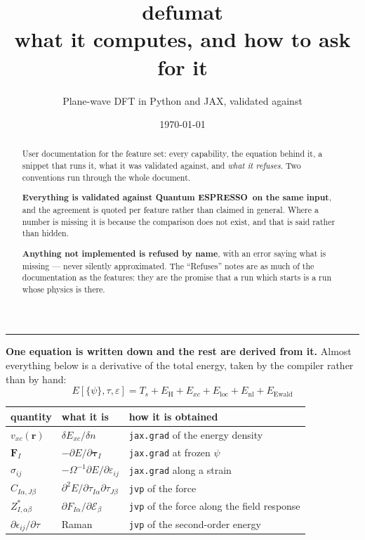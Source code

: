 \documentclass[11pt,a4paper]{article}
\title{\textbf{defumat}\\[4pt]
  \large what it computes, and how to ask for it}
\author{\normalsize Plane-wave DFT in Python and JAX, validated against \qe}
\date{\normalsize\today}
\newcommand{\qe}{Quantum ESPRESSO}
\newcommand{\code}[1]{\texttt{\small #1}}
\begin{document}
\maketitle
\thispagestyle{empty}

\begin{abstract}
\noindent
User documentation for the feature set: every capability, the equation behind
it, a snippet that runs it, what it was validated against, and \emph{what it
refuses}. Two conventions run through the whole document.

\textbf{Everything is validated against \qe\ on the same input}, and the
agreement is quoted per feature rather than claimed in general. Where a number
is missing it is because the comparison does not exist, and that is said rather
than hidden.

\textbf{Anything not implemented is refused by name}, with an error saying what
is missing --- never silently approximated. The ``Refuses'' notes are as much of
the documentation as the features: they are the promise that a run which starts
is a run whose physics is there.
\end{abstract}

\vspace{4pt}
\hrule
\vspace{6pt}

\textbf{One equation is written down and the rest are derived from it.} Almost
everything below is a derivative of the total energy, taken by the compiler
rather than by hand:
\begin{equation*}
E[\{\psi\},\tau,\varepsilon] = T_s + E_{\mathrm H} + E_{xc}
  + E_{\mathrm{loc}} + E_{\mathrm{nl}} + E_{\mathrm{Ewald}}
\end{equation*}

\begin{center}
\small
\begin{tabular}{@{}lll@{}}
\toprule
\textbf{quantity} & \textbf{what it is} & \textbf{how it is obtained} \\
\midrule
$v_{xc}(\mathbf r)$ & $\delta E_{xc}/\delta n$ & \code{jax.grad} of the energy density \\
$\mathbf F_I$ & $-\partial E/\partial\boldsymbol\tau_I$ & \code{jax.grad} at frozen $\psi$ \\
$\sigma_{ij}$ & $-\Omega^{-1}\partial E/\partial\varepsilon_{ij}$ & \code{jax.grad} along a strain \\
$C_{I\alpha,J\beta}$ & $\partial^2 E/\partial\tau_{I\alpha}\partial\tau_{J\beta}$ & \code{jvp} of the force \\
$Z^{\ast}_{I,\alpha\beta}$ & $\partial F_{I\alpha}/\partial\mathcal E_\beta$ & \code{jvp} of the force along the field response \\
$\partial\epsilon_{ij}/\partial\tau$ & Raman & \code{jvp} of the second-order energy \\
\bottomrule
\end{tabular}
\end{center}
\end{document}
